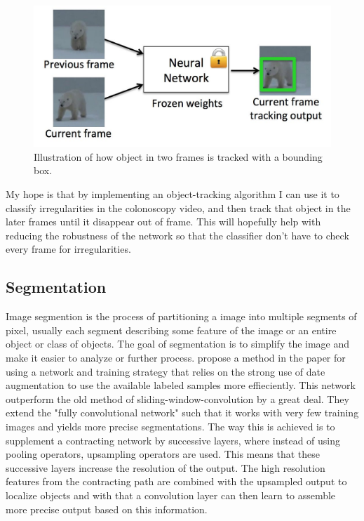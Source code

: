 \documentclass[english, a4paper]{report}
\begin{document}
\begin{figure}[H] %
  \begin{center}
    \includegraphics[width=\textwidth]{object-tracking.jpg}
    \caption{Illustration of how object in two frames is tracked with a bounding box. \cite{GOTURNDeep} }
    \label{fig:object-tracking}
  \end{center}
\end{figure}

My hope is that by implementing an object-tracking algorithm I can use it to classify irregularities in the colonoscopy video, and then track that object in the later frames until it disappear out of frame. This will hopefully help with reducing the robustness of the network so that the classifier don't have to check every frame for irregularities. 



\subsection{Segmentation}
Image segmention is the process of partitioning a image into multiple segments of pixel, usually each segment describing some feature of the image or an entire object or class of objects. The goal of segmentation is to simplify the image and make it easier to analyze or further process. \citeauthor*{UNetConvolutional15} propose a method in the paper  \cite{UNetConvolutional15} for using a network and training strategy that relies on the strong use of date augmentation to use the available labeled samples more effieciently. This network outperform the old method of sliding-window-convolution by a great deal. They extend the "fully convolutional network" \cite{FullyConvolutional15} such that it works with very few training images and yields more precise segmentations. The way this is achieved is to supplement a contracting network by successive layers, where instead of using pooling operators, upsampling operators are used. This means that these successive layers increase the resolution of the output. The high resolution features from the contracting path are combined with the upsampled output to localize objects and with that a convolution layer can then learn to assemble more precise output based on this information. 
\end{document}
